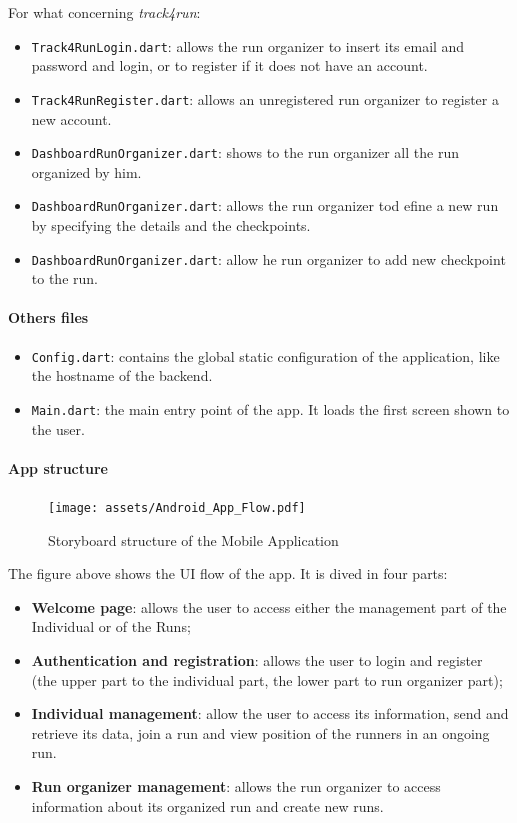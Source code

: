 For what concerning \textit{track4run}:
\begin{itemize}
    \item \texttt{Track4RunLogin.dart}: allows the run organizer to insert its email and password and login, or to register if it does not have an account.
    \item \texttt{Track4RunRegister.dart}: allows an unregistered run organizer to register a new account.
    \item \texttt{DashboardRunOrganizer.dart}: shows to the run organizer all the run organized by him.
    \item \texttt{DashboardRunOrganizer.dart}: allows the run organizer tod efine a new run by specifying the details and the checkpoints.
    \item \texttt{DashboardRunOrganizer.dart}: allow he run organizer to add new checkpoint to the run.
\end{itemize}

\paragraph{Others files}
\begin{itemize}
    \item \texttt{Config.dart}: contains the global static configuration of the application, like the hostname of the backend.
    \item \texttt{Main.dart}: the main entry point of the app. It loads the first screen shown to the user.
\end{itemize}

\paragraph{App structure}
\begin{figure}[H]
	\texttt{[image: assets/Android\_App\_Flow.pdf]}
	\caption{Storyboard structure of the Mobile Application}
	\label{fig:StoryBoard}
\end{figure}
The figure above shows the UI flow of the app.
It is dived in four parts:
\begin{itemize}
    \item \textbf{Welcome page}: allows the user to access either the management part of the Individual or of the Runs;
    \item \textbf{Authentication and registration}: allows the user to login and register (the upper part to the individual part, the lower part to run organizer part);
    \item \textbf{Individual management}: allow the user to access its information, send and retrieve its data, join a run and view position of the runners in an ongoing run.
    \item \textbf{Run organizer management}: allows the run organizer to access information about its organized run and create new runs.
\end{itemize}




